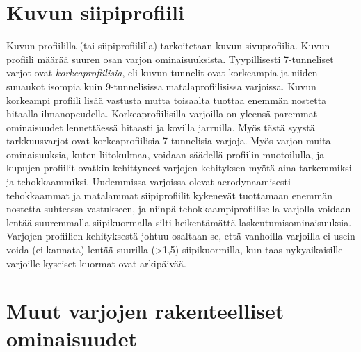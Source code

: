 \section{ Kuvun siipiprofiili }
\label{varjon-ominaisuudet-kuvun-siipiprofiili}


Kuvun profiililla (tai siipiprofiililla) tarkoitetaan kuvun sivuprofiilia. Kuvun profiili määrää suuren osan varjon ominaisuuksista. Tyypillisesti 7-tunneliset varjot ovat \textit{korkeaprofiilisia}, eli kuvun tunnelit ovat korkeampia ja niiden suuaukot isompia kuin 9-tunnelisissa matalaprofiilisissa varjoissa. Kuvun korkeampi profiili lisää vastusta mutta toisaalta tuottaa enemmän nostetta hitaalla ilmanopeudella. Korkeaprofiilisilla varjoilla on yleensä paremmat ominaisuudet lennettäessä hitaasti ja kovilla jarruilla. Myös tästä syystä tarkkuusvarjot ovat korkeaprofiilisia 7-tunnelisia varjoja. Myös varjon muita ominaisuuksia, kuten liitokulmaa, voidaan säädellä profiilin muotoilulla, ja kupujen profiilit ovatkin kehittyneet varjojen kehityksen myötä aina tarkemmiksi ja tehokkaammiksi. Uudemmissa varjoissa olevat aerodynaamisesti tehokkaammat ja matalammat siipiprofiilit kykenevät tuottamaan enemmän nostetta suhteessa vastukseen, ja niinpä tehokkaampiprofiilisella varjolla voidaan lentää suuremmalla siipikuormalla silti heikentämättä laskeutumisominaisuuksia. Varjojen profiilien kehityksestä johtuu osaltaan se, että vanhoilla varjoilla ei usein voida (ei kannata) lentää suurilla (>1,5) siipikuormilla, kun taas nykyaikaisille varjoille kyseiset kuormat ovat arkipäivää. 

\section{ Muut varjojen rakenteelliset ominaisuudet }
\label{varjon-ominaisuudet-muut-varjojen-rakenteelliset-ominaisuudet}


